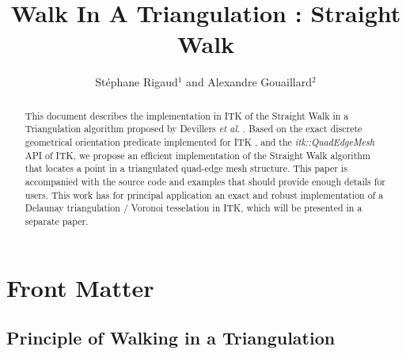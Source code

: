 \documentclass{InsightArticle}
\title{Walk In A Triangulation : Straight Walk}
\author{St\'{e}phane Rigaud$^{1}$ and Alexandre Gouaillard$^{2}$}
\newcommand{\IJhandlerIDnumber}{1338} %
\begin{document}
%
% 
\IJhandlefooter{\IJhandlerIDnumber}


\ifpdf
\else
\fi


\maketitle


\ifhtml
\chapter*{Front Matter\label{front}}
\fi


\begin{abstract}
\noindent
This document describes the implementation in ITK of the Straight Walk in a Triangulation algorithm proposed by Devillers \emph{et al.} \cite{Devillers2001}. Based on the exact discrete geometrical orientation predicate implemented for ITK \cite{Moreau2011}, and the \emph{itk::QuadEdgeMesh} API of ITK, we propose an efficient implementation of the Straight Walk algorithm that locates a point in a triangulated quad-edge mesh structure. This paper is accompanied with the source code and examples that should provide enough details for users.
This work has for principal application an exact and robust implementation of a Delaunay triangulation / Voronoi tesselation in ITK, which will be presented in a separate paper.


\end{abstract}

\IJhandlenote{\IJhandlerIDnumber}

\tableofcontents

\section{Principle of Walking in a Triangulation}
\end{document}
